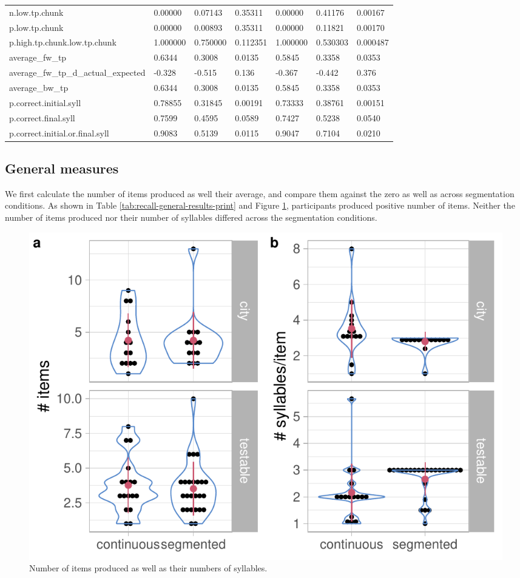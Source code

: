 \documentclass[]{article}
\begin{document}
\begin{table}[!h]
{\begin{tabular}[t]{lllllll}
n.low.tp.chunk & 0.00000 & 0.07143 & 0.35311 & 0.00000 & 0.41176 & 0.00167\\
p.low.tp.chunk & 0.00000 & 0.00893 & 0.35311 & 0.00000 & 0.11821 & 0.00170\\
p.high.tp.chunk.low.tp.chunk & 1.000000 & 0.750000 & 0.112351 & 1.000000 & 0.530303 & 0.000487\\
\addlinespace
average\_fw\_tp & 0.6344 & 0.3008 & 0.0135 & 0.5845 & 0.3358 & 0.0353\\
average\_fw\_tp\_d\_actual\_expected & -0.328 & -0.515 & 0.136 & -0.367 & -0.442 & 0.376\\
average\_bw\_tp & 0.6344 & 0.3008 & 0.0135 & 0.5845 & 0.3358 & 0.0353\\
p.correct.initial.syll & 0.78855 & 0.31845 & 0.00191 & 0.73333 & 0.38761 & 0.00151\\
p.correct.final.syll & 0.7599 & 0.4595 & 0.0589 & 0.7427 & 0.5238 & 0.0540\\
\addlinespace
p.correct.initial.or.final.syll & 0.9083 & 0.5139 & 0.0115 & 0.9047 & 0.7104 & 0.0210\\
\bottomrule
\end{tabular}}
\end{table}

\subsection{General measures}\label{general-measures}

We first calculate the number of items produced as well their average,
and compare them against the zero as well as across segmentation
conditions. As shown in Table \ref{tab:recall-general-results-print} and
Figure \ref{fig:recall-general-measures-plot}, participants produced
positive number of items. Neither the number of items produced nor their
number of syllables differed across the segmentation conditions.

\begin{figure}

{\centering \includegraphics[width=0.8\linewidth]{segmentation_recall_combined_files/figure-latex/recall-general-measures-plot-1} 

}

\caption{Number of items produced as well as their numbers of syllables.}\label{fig:recall-general-measures-plot}
\end{figure}
\end{document}
